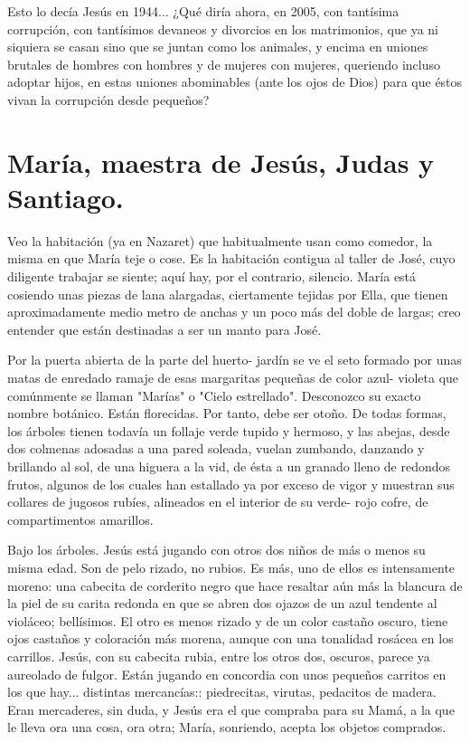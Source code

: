 \documentclass[12pt]{book} %
\begin{document}
Esto lo decía Jesús en 1944... ¿Qué diría ahora, en 2005, con tantísima corrupción, con tantísimos devaneos y divorcios en los matrimonios, que ya ni siquiera se casan sino que se juntan como los animales, y encima en uniones brutales de hombres con hombres y de mujeres con mujeres, queriendo incluso adoptar hijos, en estas uniones abominables (ante los ojos de Dios) para que éstos vivan la corrupción desde pequeños?

 
\chapter*{María, maestra de Jesús, Judas y Santiago.}

Veo la habitación (ya en Nazaret) que habitualmente usan como comedor, la misma en que María teje o cose. Es la habitación contigua al taller de José, cuyo diligente trabajar se siente; aquí hay, por el contrario, silencio. María está cosiendo unas piezas de lana alargadas, ciertamente tejidas por Ella, que tienen aproximadamente medio metro de anchas y un poco más del doble de largas; creo entender que están destinadas a ser un manto para José. 

Por la puerta abierta de la parte del huerto- jardín se ve el seto formado por unas matas de enredado ramaje de esas margaritas pequeñas de color azul- violeta que comúnmente se llaman "Marías" o "Cielo estrellado". Desconozco su exacto nombre botánico. Están florecidas. Por tanto, debe ser otoño. De todas formas, los árboles tienen todavía un follaje verde tupido y hermoso, y las abejas, desde dos colmenas adosadas a una pared soleada, vuelan zumbando, danzando y brillando al sol, de una higuera a la vid, de ésta a un granado lleno de redondos frutos, algunos de los cuales han estallado ya por exceso de vigor y muestran sus collares de jugosos rubíes, alineados en el interior de su verde- rojo cofre, de compartimentos amarillos. 

Bajo los árboles. Jesús está jugando con otros dos niños de más o menos su misma edad. Son de pelo rizado, no rubios. Es más, uno de ellos es intensamente moreno: una cabecita de corderito negro que hace resaltar aún más la blancura de la piel de su carita redonda en que se abren dos ojazos de un azul tendente al violáceo; bellísimos. El otro es menos rizado y de un color castaño oscuro, tiene ojos castaños y coloración más morena, aunque con una tonalidad rosácea en los carrillos. Jesús, con su cabecita rubia, entre los otros dos, oscuros, parece ya aureolado de fulgor. Están jugando en concordia con unos pequeños carritos en los que hay... distintas mercancías:: piedrecitas, virutas, pedacitos de madera. Eran mercaderes, sin duda, y Jesús era el que compraba para su Mamá, a la que le lleva ora una cosa, ora otra; María, sonriendo, acepta los objetos comprados. 
\end{document}
